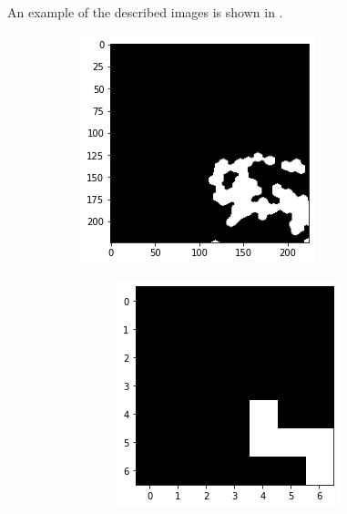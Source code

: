 \documentclass[10pt,twocolumn,hidelinks,letterpaper]{article}
\begin{document}
An example of the described images is shown in .

\begin{figure}[t]
	\centering

	\begin{subfigure}{.4\linewidth}
		\includegraphics[width=\linewidth]{images/mmaps_example/downsampling224x224_bw.png}
	\end{subfigure}
  \begin{subfigure}{.57\linewidth}
    \begin{subfigure}{.32\linewidth}
  		\includegraphics[width=\linewidth]{images/mmaps_example/downsampling7x7_bw.png}

\end{subfigure}
\end{subfigure}
\end{figure}
\end{document}

